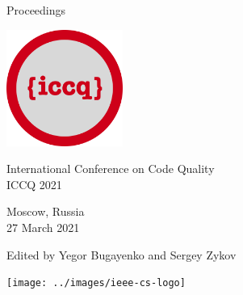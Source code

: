 
\thispagestyle{empty}
\begin{center}
Proceedings

\vspace{1in}

\includegraphics[height=1.5in]{../../logo}

\vspace{0.5in}

{\Large International Conference on Code Quality\\[12pt]
ICCQ 2021}

\vspace{0.5in}

Moscow, Russia\\
27 March 2021

\vspace{0.5in}

Edited by Yegor Bugayenko and Sergey Zykov

\vspace{1.5in}




\texttt{[image: ../images/ieee-cs-logo]}

\end{center}
